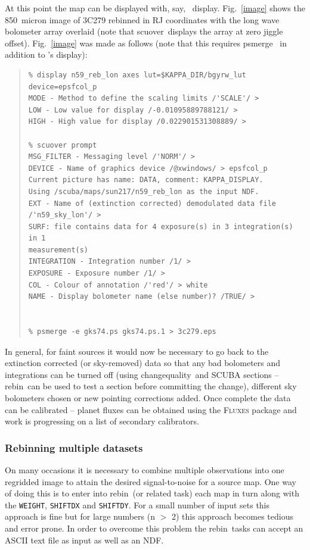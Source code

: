 \documentclass[twoside,11pt]{article}
\newcommand{\Kappa}{\xref{{\sc{Kappa}}}{sun95}{}}
\newcommand{\task}[1]{{\sf #1}}
\newcommand{\param}[1]{{\tt #1}}
\newcommand{\rebin}{\htmlref{\task{rebin}}{REBIN}}
\newcommand{\chgqual}{\htmlref{\task{change\_quality}}{CHANGE_QUALITY}}
\newcommand{\scuover}{\htmlref{\task{scuover}}{SCUOVER}}
\newcommand{\display}{\xref{\task{display}}{sun95}{DISPLAY}}
\newcommand{\psmerge}{\xref{\task{psmerge}}{sun164}{}}
\newenvironment{myquote}{\begin{quote}\begin{small}}{\end{small}\end{quote}}
\newcommand{\htmlref}[2]{#1}
\newcommand{\xref}[3]{#1}
\renewcommand{\_}{\texttt{\symbol{95}}}
\begin{document}
At this point the map can be displayed with, say, \Kappa\ \display. 
Fig.\ \ref{image} shows the 850~micron image of 3C279 rebinned in RJ
coordinates with the long wave bolometer array overlaid (note that 
\scuover\ displays the array at zero jiggle offset).
Fig.\ \ref{image} was made as follows (note that this requires
\psmerge\ \cite{psmerge} in addition to \Kappa's \display):

\begin{myquote}
\begin{verbatim}
% display n59_reb_lon axes lut=$KAPPA_DIR/bgyrw_lut device=epsfcol_p
MODE - Method to define the scaling limits /'SCALE'/ > 
LOW - Low value for display /-0.01095889788121/ > 
HIGH - High value for display /0.022901531308889/ >

% scuover prompt
MSG_FILTER - Messaging level /'NORM'/ > 
DEVICE - Name of graphics device /@xwindows/ > epsfcol_p
Current picture has name: DATA, comment: KAPPA_DISPLAY.
Using /scuba/maps/sun217/n59_reb_lon as the input NDF.
EXT - Name of (extinction corrected) demodulated data file /'n59_sky_lon'/ > 
SURF: file contains data for 4 exposure(s) in 3 integration(s) in 1
measurement(s)
INTEGRATION - Integration number /1/ > 
EXPOSURE - Exposure number /1/ > 
COL - Colour of annotation /'red'/ > white
NAME - Display bolometer name (else number)? /TRUE/ > 


% psmerge -e gks74.ps gks74.ps.1 > 3c279.eps
\end{verbatim}
\end{myquote}

In general, for faint sources it would now be necessary to go back to the
extinction corrected (or sky-removed) data so that any bad bolometers and
integrations can be turned off (using \chgqual\ and SCUBA sections -- \rebin\
can be used to test a section before committing the change), different sky
bolometers chosen or new pointing corrections added. Once complete the data
can be calibrated -- planet fluxes can be obtained using the \textsc{Fluxes}
package and work is progressing on a list of secondary calibrators.


\subsubsection{Rebinning multiple datasets}
\label{batch}

On many occasions it is necessary to combine multiple observations into one
regridded image to attain the desired signal-to-noise for a source map. One
way of doing this is to enter into \rebin\ (or related task) each map in turn
along with the \param{WEIGHT}, \param{SHIFT\_DX} and \param{SHIFT\_DY}. For a
small number of input sets this approach is fine but for large numbers (n $>$
2) this approach becomes tedious and error prone.  In order to overcome this
problem the \rebin\ tasks can accept an ASCII text file as input as well as an
NDF.
\end{document}
